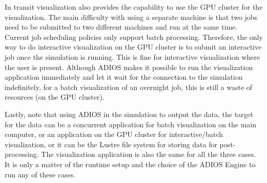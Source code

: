 In transit visualization also provides the capability to use the GPU cluster for the visualization. The main difficulty with using a separate machine is that two jobs need to be submitted to two different machines and run at the same time.
Current job scheduling policies only support batch processing. Therefore, the only way to do interactive visualization on the GPU cluster is to submit an interactive job once the simulation is running.
This is fine for interactive visualization where the user is present. Although ADIOS makes it possible to run the visualization application immediately and let it wait for the connection to the simulation indefinitely, for a batch visualization of an overnight job, this is still a waste of resources (on the GPU cluster).

Lastly, note that using ADIOS in the simulation to output the data, the target for the data can be a concurrent application for batch visualization on the main computer, or an application on the GPU cluster for interactive/batch visualization, or it can be the Lustre file system for storing data for post-processing. The visualization application is also the same for all the three cases. It is only a matter of the runtime setup and the choice of the ADIOS Engine to run any of these cases. 
